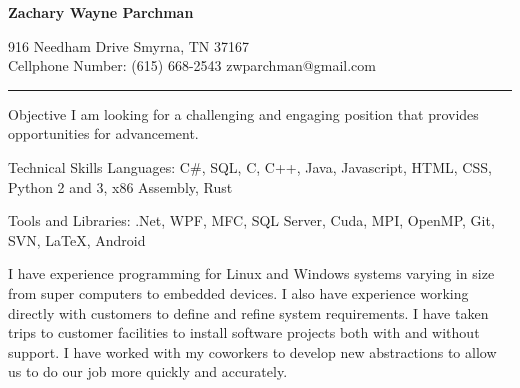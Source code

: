 \documentclass{res} \usepackage{tabularx} \usepackage{changepage}
\begin{document}
 


\fontsize{10}{11}\selectfont

\begin{resume}

\vspace{-20mm}
\begin{center}
    {\bf \Huge Zachary Wayne Parchman}
\end{center}
\vspace{-4mm}

\begin{large}
    916 Needham Drive Smyrna, TN 37167 \\
    Cellphone Number: (615) 668-2543 \hfill
    zwparchman@gmail.com
\end{large}
\rule{\textwidth}{0.4pt}

\begin{section}{Objective}
    I am looking for a challenging and engaging position that provides opportunities for advancement.
\end{section}

\begin{section}{Technical Skills}
    {Languages: C\#, SQL, C, C++, Java, Javascript, HTML, CSS, Python 2 and 3, x86 Assembly, Rust}

    {Tools and Libraries: .Net, WPF, MFC, SQL Server, Cuda,  MPI, OpenMP, Git, SVN, \LaTeX, Android}

    I have experience programming for Linux and Windows systems varying in size from super computers to embedded devices. 
    I also have experience working directly with customers to define and refine system requirements.
    I have taken trips to customer facilities to install software projects both with and without support.
    I have worked with my coworkers to develop new abstractions to allow us to do our job more quickly and accurately.
\end{section}


\end{resume}
\end{document}
